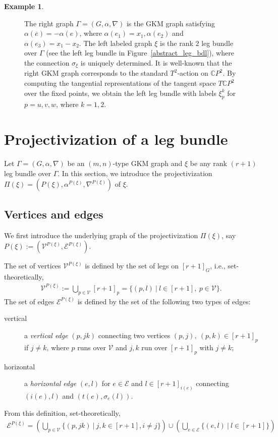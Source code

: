 \documentclass[12pt]{amsart}
\theoremstyle{definition}
\newtheorem{example}[theorem]{Example}
\theoremstyle{remark}
\numberwithin{equation}{section}
\begin{document}
\begin{example}
\begin{figure}[H]
\caption{The right graph $\Gamma=(G,\alpha,\nabla)$ is the GKM graph satisfying $\alpha(\overline{e})=-\alpha(e)$, where $\alpha(e_{1})=x_{1}, \alpha(e_{2})$ and $\alpha(e_{3})=x_{1}-x_{2}$.
The left labeled graph $\xi$ is the rank $2$ leg bundle over $\Gamma$ (see the left leg bundle in Figure~\ref{abstract_leg_bdl}), where
the connection $\sigma_{\xi}$ is uniquely determined.
It is well-known that the right GKM graph corresponds to the standard $T^{2}$-action on $\mathbb{C}P^{2}$. By computing the tangential representations of the tangent space $T\mathbb{C}P^{2}$ over the fixed points, we obtain the left leg bundle with labels $\xi_{p}^{k}$ for $p=u,v,w$, where $k=1,2$.}
\label{figure_triangle}
\end{figure}
\end{example}

\section{Projectivization of a leg bundle}
\label{sect:3}

Let $\Gamma=(G,\alpha,\nabla)$ be an $(m,n)$-type GKM graph and $\xi$ be any rank $(r+1)$ leg bundle over $\Gamma$.
In this section, we introduce the projectivization $\Pi(\xi)=(P(\xi),\alpha^{P(\xi)},\nabla^{P(\xi)})$ of $\xi$.

\subsection{Vertices and edges}
\label{sect:3.1}
We first introduce the underlying graph of the projectivization $\Pi(\xi)$, say $P(\xi):=(\mathcal{V}^{P(\xi)},\mathcal{E}^{P(\xi)})$.

The set of vertices $\mathcal{V}^{P(\xi)}$ is defined by the set of legs on $[r+1]_{G}$, i.e., set-theoretically,
\begin{align*}
\mathcal{V}^{P(\xi)}:=\bigcup_{p\in \mathcal{V}}[r+1]_{p}=\{(p,l)\ |\ l\in [r+1],\ p\in \mathcal{V}\}.
\end{align*}
The set of edges $\mathcal{E}^{P(\xi)}$ is defined by the set of the following two types of edges:
\begin{description}
\item[vertical]
a {\it vertical edge} $(p,jk)$ connecting two vertices $(p,j),\ (p,k)\in [r+1]_{p}$ if $j\not=k$, where $p$ runs over $\mathcal{V}$ and $j,k$ run over $[r+1]_{p}$ with $j\not=k$;
\item[horizontal]
a {\it horizontal edge} $(e,l)$ for $e\in \mathcal{E}$ and $l\in [r+1]_{i(e)}$ connecting $(i(e),l)$ and $(t(e),\sigma_{e}(l))$.
\end{description}
From this definition, set-theoretically,
\begin{align*}
\mathcal{E}^{P(\xi)}=\left(\bigcup_{p\in \mathcal{V}}\{(p,jk)\ |\ j,k\in [r+1], i\not=j\}\right)\cup
\left(\bigcup_{e\in \mathcal{E}}\{(e,l)\ |\ l\in [r+1]\} \right)
\end{align*}
\end{document}
